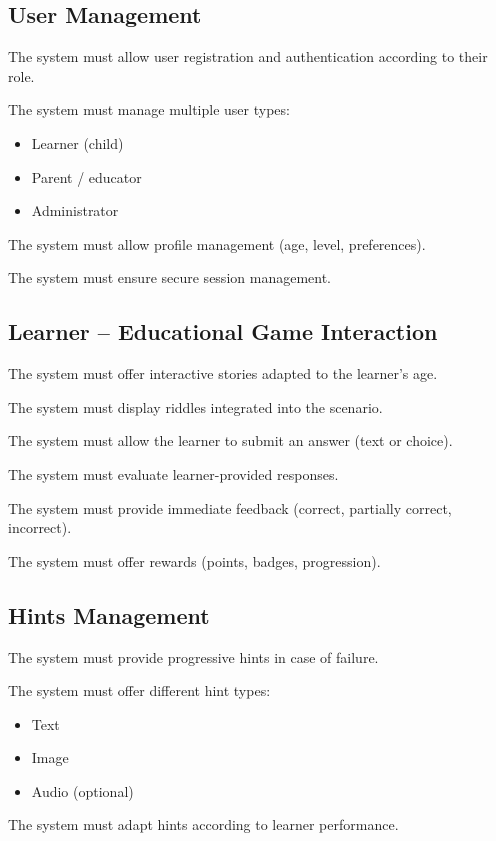 \documentclass[12pt,a4paper]{article}
\begin{document}
\subsection{User Management}

The system must allow user registration and authentication according to their role.

The system must manage multiple user types:
\begin{itemize}
    \item Learner (child)
    \item Parent / educator
    \item Administrator
\end{itemize}

The system must allow profile management (age, level, preferences).

The system must ensure secure session management.

\subsection{Learner -- Educational Game Interaction}

The system must offer interactive stories adapted to the learner's age.

The system must display riddles integrated into the scenario.

The system must allow the learner to submit an answer (text or choice).

The system must evaluate learner-provided responses.

The system must provide immediate feedback (correct, partially correct, incorrect).

The system must offer rewards (points, badges, progression).

\subsection{Hints Management}

The system must provide progressive hints in case of failure.

The system must offer different hint types:
\begin{itemize}
    \item Text
    \item Image
    \item Audio (optional)
\end{itemize}

The system must adapt hints according to learner performance.
\end{document}
